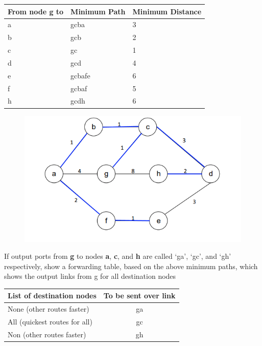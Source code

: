 \documentclass[12pt, a4paper]{article}
\begin{document}
\begin{table}[H]
	\begin{tabular}{lll}
		\toprule
		From node g to & Minimum Path & Minimum Distance \\ \midrule
		a              & gcba         & 3                \\
		b              & gcb          & 2                \\
		c              & gc           & 1                \\
		d              & gcd          & 4                \\
		e              & gcbafe       & 6                \\
		f              & gcbaf        & 5                \\
		h              & gcdh         & 6
	\end{tabular}
\end{table}
\begin{figure}[H]
	\includegraphics[width=\linewidth]{q1b}
\end{figure}
If output ports from \textbf{g} to nodes \textbf{a}, \textbf{c}, and \textbf{h} are called `ga', `gc', and `gh' respectively, show a forwarding table, based on the above minimum paths, which shows the output links from g for all destination nodes
\begin{table}[H]
	\centering
	\begin{tabular}{lc}
		\toprule
		List of destination nodes & To be sent over link\\
		\midrule
		None (other routes faster) & ga\\
		All (quickest routes for all) & gc\\
		Non (other routes faster) & gh
	\end{tabular}
\end{table}
\end{document}
